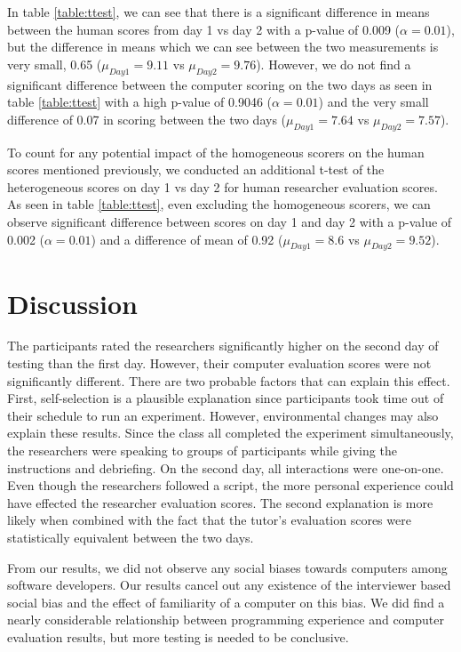 \documentclass{sig-alternate-05-2015}
\begin{document}
In table \ref{table:ttest}, we can see that there is a significant difference in means between the human scores from day 1 vs day 2 with a p-value of 0.009 ($\alpha=0.01$), but the difference in means which we can see between the two measurements is very small, 0.65 ($\mu_{Day 1}=9.11$ vs $\mu_{Day 2}=9.76$). However, we do not find a significant difference between the computer scoring on the two days as seen in table \ref{table:ttest} with a high p-value of 0.9046 ($\alpha=0.01$) and the very small difference of 0.07 in scoring between the two days ($\mu_{Day 1}=7.64$ vs $\mu_{Day 2}=7.57$).

To count for any potential impact of the homogeneous scorers on the human scores mentioned previously, we conducted an additional t-test of the heterogeneous scores on day 1 vs day 2 for human researcher evaluation scores. As seen in table \ref{table:ttest}, even excluding the homogeneous scorers, we can observe significant difference between scores on day 1 and day 2 with a p-value of 0.002 ($\alpha=0.01$) and a difference of mean of 0.92 ($\mu_{Day 1}=8.6$ vs $\mu_{Day 2}=9.52$).

\section{Discussion}

The participants rated the researchers significantly higher on the second day of testing than the first day.  However, their computer evaluation scores were not significantly different.  There are two probable factors that can explain this effect.  First, self-selection is a plausible  explanation since participants took time out of their schedule to run an experiment.  However, environmental changes may also explain these results.  Since the class all completed the experiment simultaneously, the researchers were speaking to groups of participants while giving the instructions and debriefing.  On the second day, all interactions were one-on-one. Even though the researchers followed a script, the more personal experience could have effected the researcher evaluation scores.  The second explanation is more likely when combined with the fact that the tutor's evaluation scores were statistically equivalent between the two days.

From our results, we did not observe any social biases towards computers among software developers. Our results cancel out any existence of the interviewer based social bias and the effect of familiarity of a computer on this bias. We did find a nearly considerable relationship between programming experience and computer evaluation results, but more testing is needed to be conclusive.
\end{document}
